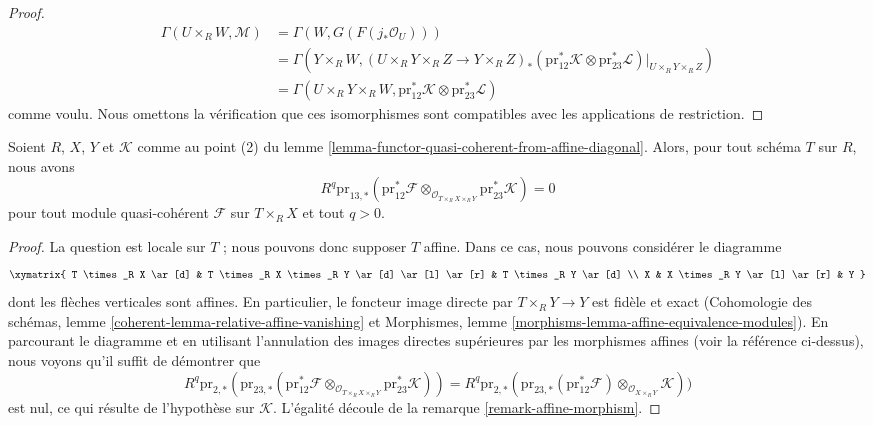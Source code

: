 \begin{proof}
\begingroup\small
\begin{align*}
\Gamma(U \times_R W, \mathcal{M})
& =
\Gamma(W, G(F(j_*\mathcal{O}_U))) \\
& =
\Gamma(Y \times_R W, (U \times_R Y \times_R Z \to Y \times_R Z)_*
(\text{pr}_{12}^*\mathcal{K} \otimes
\text{pr}_{23}^*\mathcal{L})|_{U \times_R Y \times_R Z}) \\
& =
\Gamma(U \times_R Y \times_R W,
\text{pr}_{12}^*\mathcal{K} \otimes \text{pr}_{23}^*\mathcal{L})
\end{align*}
\endgroup
comme voulu. Nous omettons la vérification que ces isomorphismes sont
compatibles avec les applications de restriction.
\end{proof}

\begin{lemma}
\label{lemma-persistence-exactness}
Soient $R$, $X$, $Y$ et $\mathcal{K}$ comme au point (2) du
lemme \ref{lemma-functor-quasi-coherent-from-affine-diagonal}.
Alors, pour tout schéma $T$ sur $R$, nous avons
$$
R^q\text{pr}_{13, *}(\text{pr}_{12}^*\mathcal{F}
\otimes_{\mathcal{O}_{T \times_R X \times_R Y}}
\text{pr}_{23}^*\mathcal{K}) = 0
$$
pour tout module quasi-cohérent $\mathcal{F}$ sur $T \times_R X$ et tout
$q > 0$.
\end{lemma}

\begin{proof}
La question est locale sur $T$ ; nous pouvons donc supposer $T$ affine.
Dans ce cas, nous pouvons considérer le diagramme
$$
\xymatrix{
T \times_R X \ar[d] &
T \times_R X \times_R Y \ar[d] \ar[l] \ar[r] &
T \times_R Y \ar[d] \\
X &
X \times_R Y \ar[l] \ar[r] &
Y
}
$$
dont les flèches verticales sont affines. En particulier, le foncteur image
directe par $T \times_R Y \to Y$ est fidèle et exact (Cohomologie des schémas,
lemme \ref{coherent-lemma-relative-affine-vanishing} et
Morphismes, lemme \ref{morphisms-lemma-affine-equivalence-modules}).
En parcourant le diagramme et en utilisant l'annulation des images directes
supérieures par les morphismes affines (voir la référence ci-dessus), nous
voyons qu'il suffit de démontrer que
$$
R^q\text{pr}_{2, *}(
\text{pr}_{23, *}(\text{pr}_{12}^*\mathcal{F}
\otimes_{\mathcal{O}_{T \times_R X \times_R Y}}
\text{pr}_{23}^*\mathcal{K})) =
R^q\text{pr}_{2, *}(
\text{pr}_{23, *}(\text{pr}_{12}^*\mathcal{F})
\otimes_{\mathcal{O}_{X \times_R Y}}
\mathcal{K}))
$$
est nul, ce qui résulte de l'hypothèse sur $\mathcal{K}$.
L'égalité découle de la remarque \ref{remark-affine-morphism}.
\end{proof}

